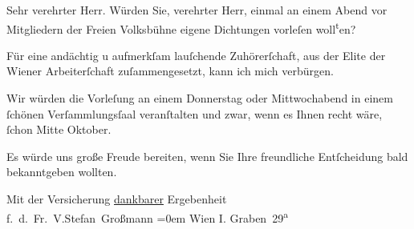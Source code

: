 \pstart{}Sehr verehrter Herr.\pend\vspace{0.5em}
\pstart
           Würden Sie, verehrter Herr, einmal an einem Abend vor Mitgliedern der Freien Volksbühne eigene Dichtungen vorleſen woll\substVorne{}\textsuperscript{t}\substDazwischen{}e\substHinten{}n?\pend
           
\pstart
           Für eine andächtig u aufmerkſam lauſchende Zuhörerſchaft, aus der Elite der Wiener Arbeiterſchaft zuſammengesetzt, kann ich
               mich verbürgen.\pend
           
\pstart
           Wir würden die Vorleſung an einem Donnerstag oder Mittwochabend in einem{ }ſchönen
               Verſammlungsſaal veranſtalten und zwar, wenn es Ihnen recht wäre,{ }ſchon Mitte
               Oktober.\pend
           
\pstart
            Es würde uns große Freude bereiten, wenn Sie
               Ihre freundliche Entſcheidung bald bekanntgeben wollten.\pend
           
\pstart
           Mit der Versicherung \uline{dankbarer} Ergebenheit{\\[\baselineskip]}
                  f. d. Fr. V.\spacefill\mbox{Stefan Großmann}\pend
           \leftskip=0em{}
\pstart
           \noindent{}Wien I. Graben 29\textsuperscript{a}\pend
           \endnumbering{}  \newcommand{\dateiname}{L01711}\newcommand{\titel}{Stefan Großmann an Arthur Schnitzler, 27. 9. 1907}\newcommand{\editorInnen}{Herausgegeben von Martin Anton Müller}
